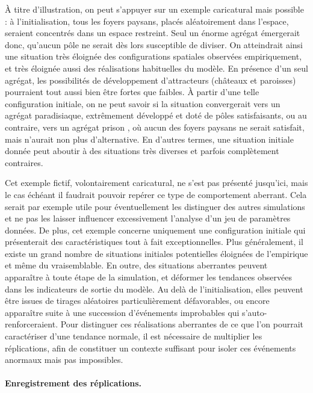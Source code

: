 À titre d'illustration, on peut s'appuyer sur un exemple caricatural mais possible : à l'initialisation, tous les foyers paysans, placés aléatoirement dans l'espace, seraient concentrés dans un espace restreint.
Seul un énorme agrégat émergerait donc, qu'aucun pôle ne serait dès lors susceptible de diviser.
On atteindrait ainsi une situation très éloignée des configurations spatiales observées empiriquement, et très éloignée aussi des réalisations habituelles du modèle.
En présence d'un seul agrégat, les possibilités de développement d'attracteurs (châteaux et paroisses) pourraient tout aussi bien être fortes que faibles.
À partir d'une telle configuration initiale, on ne peut savoir si la situation convergerait vers un agrégat \og paradisiaque\fg{}, extrêmement développé et doté de pôles satisfaisants, ou au contraire, vers un agrégat \og prison \fg{}, où aucun des foyers paysans ne serait satisfait, mais n'aurait non plus d'alternative.
En d'autres termes, une situation initiale donnée peut aboutir à des situations très diverses et parfois complètement contraires.

Cet exemple fictif, volontairement caricatural, ne s'est pas présenté jusqu'ici, mais le cas échéant il faudrait pouvoir repérer ce type de comportement aberrant.
Cela serait par exemple utile pour éventuellement les distinguer des autres simulations et ne pas les laisser influencer excessivement l'analyse d'un jeu de paramètres données.
De plus, cet exemple concerne uniquement une configuration initiale qui présenterait des caractéristiques tout à fait exceptionnelles.
Plus généralement, il existe un grand nombre de situations initiales potentielles éloignées de l'empirique et même du vraisemblable.
En outre, des situations aberrantes peuvent apparaître à toute étape de la simulation, et déformer les tendances observées dans les indicateurs de sortie du modèle.
Au delà de l'initialisation, elles peuvent être issues de tirages aléatoires particulièrement défavorables, ou encore apparaître suite à une succession d'événements improbables qui s'auto-renforceraient.
Pour distinguer ces réalisations aberrantes de ce que l'on pourrait caractériser d'une tendance normale, il est nécessaire de multiplier les réplications, afin de constituer un contexte suffisant pour isoler ces événements anormaux mais pas impossibles.

\paragraph{Enregistrement des réplications.}

